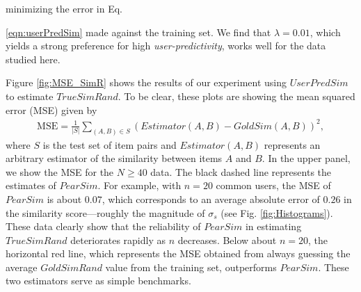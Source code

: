 \documentclass[11pt]{article}
\begin{document}
minimizing the error in Eq. {\ref{eqn:userPredSim} made against the training
set. We find that $\lambda = 0.01$, which yields a strong preference for high
{\em user-predictivity}, works well for the data studied here.

Figure \ref{fig:MSE_SimR} shows the results of our experiment using
$UserPredSim$ to estimate $TrueSimRand$. To be clear, these plots are showing
the mean squared error (MSE) given by
\begin{align}
\mathrm{MSE} = \frac{1}{\left|S\right|}\sum_{(A,B) \in S}
{\left(Estimator(A,B) - GoldSim(A,B)\right)^2},
\end{align}
where $S$ is the test set of item pairs and $Estimator(A, B)$ represents an
arbitrary estimator of the similarity between items $A$ and $B$. In the upper
panel, we show the MSE for the $N \geq 40$ data. The black dashed line
represents the estimates of $PearSim$. For example, with $n = 20$ common users,
the MSE of $PearSim$ is about $0.07$, which corresponds to an average absolute
error of $0.26$ in the similarity score---roughly the magnitude of $\sigma_s$
(see Fig. \ref{fig:Histograms}). These data clearly show that the reliability of
$PearSim$ in estimating $TrueSimRand$ deteriorates rapidly as $n$ decreases.
Below about $n = 20$, the horizontal red line, which represents the MSE obtained
from always guessing the average $GoldSimRand$ value from the training set,
outperforms $PearSim$. These two estimators serve as simple benchmarks.

}
\end{document}
